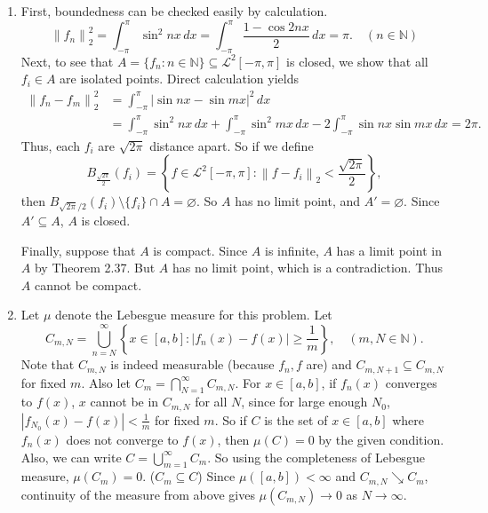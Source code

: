 \documentclass[12pt]{report}
\newcommand{\numl}[1]{\item[\large\textbf{\sffamily #1.}]}
\newcommand{\mc}[1]{\mathcal{#1}}
\newcommand{\bs}{\setminus}
\renewcommand{\subset}{\subseteq}
\newcommand{\norm}[1]{\left\lVert #1 \right\rVert}
\newcommand{\abs}[1]{\left| #1 \right|}
\newcommand{\ra}{\rightarrow}
\newcommand{\N}{\mathbb{N}}
\renewcommand{\d}[1]{\,d{#1}}
\begin{document}
\begin{enumerate}
    \numl{3} First, boundedness can be checked easily by calculation.
    \[
        \norm{f_n}_2^2 = \int_{-\pi}^{\pi} \sin^2 nx \d{x} = \int_{-\pi}^{\pi} \frac{1 - \cos 2nx}{2} \d{x} = \pi. \quad (n \in \N)
    \]
    Next, to see that \(A = \{f_n : n \in \N\} \subset \mc{L}^{2}[-\pi, \pi]\) is closed, we show that all \(f_i \in A\) are isolated points. Direct calculation yields
    \[
        \begin{aligned}
            \norm{f_n - f_m}_2^2 & = \int_{-\pi}^{\pi} \abs{\sin nx - \sin mx}^2 \d{x}                                                                           \\
                                 & = \int_{-\pi}^{\pi}  \sin^2 nx \d{x} + \int_{-\pi}^{\pi} \sin^2 mx \d{x} - 2 \int_{-\pi}^{\pi}  \sin nx \sin mx \d{x} = 2\pi.
        \end{aligned}
    \]
    Thus, each \(f_i\) are \(\sqrt{2\pi}\) distance apart. So if we define
    \[
        B_{\frac{\sqrt{2\pi}}{2}}(f_i) = \left\{f \in \mc{L}^{2}[-\pi, \pi] : \norm{f - f_i}_2 < \frac{\sqrt{2\pi}}{2}\right\},
    \]
    then \(B_{\sqrt{2\pi}/2}(f_i) \bs \{f_i\} \cap A = \varnothing\). So \(A\) has no limit point, and \(A' = \varnothing\). Since \(A' \subset A\), \(A\) is closed.

    Finally, suppose that \(A\) is compact. Since \(A\) is infinite, \(A\) has a limit point in \(A\) by {\sffamily Theorem 2.37}. But \(A\) has no limit point, which is a contradiction. Thus \(A\) cannot be compact.

    \numl{4} Let \(\mu\) denote the Lebesgue measure for this problem. Let
    \[
        C_{m, N} = \bigcup_{n=N}^{\infty} \left\{x \in [a, b] : \abs{f_n(x) - f(x)} \geq \frac{1}{m} \right\}, \quad (m, N \in \N).
    \]
    Note that \(C_{m, N}\) is indeed measurable (because \(f_n, f\) are) and \(C_{m, N+1} \subset C_{m, N}\) for fixed \(m\). Also let \(C_m = \bigcap_{N=1}^{\infty} C_{m, N}\). For \(x \in [a, b]\), if \(f_n(x)\) converges to \(f(x)\), \(x\) cannot be in \(C_{m, N}\) for all \(N\), since for large enough \(N_0\), \(\abs{f_{N_0}(x) - f(x)} < \frac{1}{m}\) for fixed \(m\). So if \(C\) is the set of \(x \in [a, b]\) where \(f_n(x)\) does not converge to \(f(x)\), then \(\mu(C) = 0\) by the given condition. Also, we can write \(C = \bigcup_{m=1}^{\infty} C_m\). So using the completeness of Lebesgue measure, \(\mu(C_m) = 0\). (\(C_m \subset C\)) Since \(\mu([a, b]) < \infty\) and \(C_{m, N} \searrow C_m\), continuity of the measure from above gives \(\mu(C_{m, N}) \ra 0\) as \(N \ra \infty\).


\end{enumerate}
\end{document}

